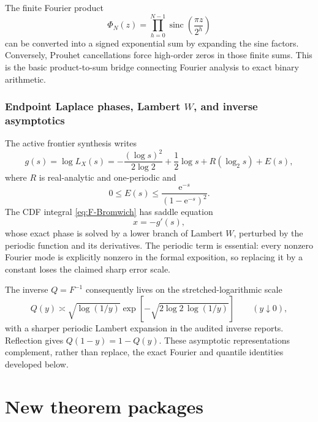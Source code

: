 \documentclass[11pt,oneside]{article}
\theoremstyle{definition}
\theoremstyle{remark}
\newcommand{\sinc}{\operatorname{sinc}}
\newcommand{\e}{\mathrm e}
\begin{document}
The finite Fourier product
\begin{equation}
 \Phi_N(z)=\prod_{h=0}^{N-1}\sinc\left(\frac{\pi z}{2^h}\right)           \label{eq:PhiN}
\end{equation}
can be converted into a signed exponential sum by expanding the sine factors.  Conversely,
Prouhet cancellations force high-order zeros in those finite sums.  This is the basic
product-to-sum bridge connecting Fourier analysis to exact binary arithmetic.

\section{Endpoint Laplace phases, Lambert \texorpdfstring{$W$}{W}, and inverse asymptotics}
\label{sec:endpoint}

The active frontier synthesis writes
\begin{equation}
 g(s)=\log L_X(s)
 =-\frac{(\log s)^2}{2\log2}+\frac12\log s
   +R(\log_2s)+E(s),                                     \label{eq:g-decomp}
\end{equation}
where $R$ is real-analytic and one-periodic and
\begin{equation}
 0\le E(s)\le\frac{\e^{-s}}{(1-\e^{-s})^2}.              \label{eq:E-bound}
\end{equation}
The CDF integral \eqref{eq:F-Bromwich} has saddle equation
\begin{equation}
 x=-g'(s),                                                \label{eq:saddle-eq}
\end{equation}
whose exact phase is solved by a lower branch of Lambert $W$, perturbed by the periodic
function and its derivatives.  The periodic term is essential: every nonzero Fourier mode is
explicitly nonzero in the formal exposition, so replacing it by a constant loses the claimed
sharp error scale.

The inverse $Q=F^{-1}$ consequently lives on the stretched-logarithmic scale
\begin{equation}
 Q(y)\asymp
 \sqrt{\log(1/y)}
 \exp\left[-\sqrt{2\log2\,\log(1/y)}\right]
 \qquad(y\downarrow0),                                  \label{eq:Q-scale}
\end{equation}
with a sharper periodic Lambert expansion in the audited inverse reports.  Reflection gives
$Q(1-y)=1-Q(y)$.  These asymptotic representations complement, rather than replace, the exact
Fourier and quantile identities developed below.

\clearpage
\part*{New theorem packages}
\end{document}
